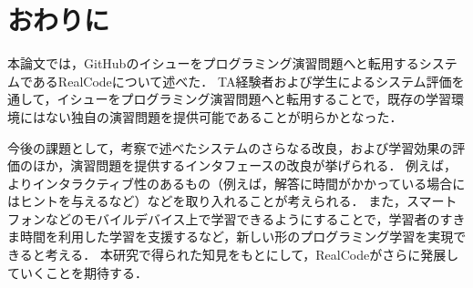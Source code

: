\chapter{おわりに}
\graphicspath{{Chapter8/Figs/}}


本論文では，GitHubのイシューをプログラミング演習問題へと転用するシステムであるRealCodeについて述べた．
TA経験者および学生によるシステム評価を通して，イシューをプログラミング演習問題へと転用することで，既存の学習環境にはない独自の演習問題を提供可能であることが明らかとなった．

今後の課題として，考察で述べたシステムのさらなる改良，および学習効果の評価のほか，演習問題を提供するインタフェースの改良が挙げられる．
例えば，よりインタラクティブ性のあるもの（例えば，解答に時間がかかっている場合にはヒントを与えるなど）などを取り入れることが考えられる．
また，スマートフォンなどのモバイルデバイス上で学習できるようにすることで，学習者のすきま時間を利用した学習を支援するなど，新しい形のプログラミング学習を実現できると考える．
本研究で得られた知見をもとにして，RealCodeがさらに発展していくことを期待する．